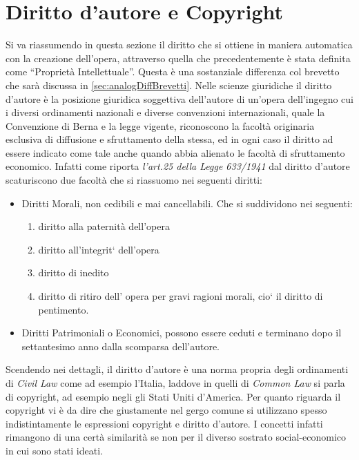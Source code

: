\section{Diritto d'autore e Copyright}
Si va riassumendo in questa sezione il diritto che si ottiene in maniera automatica con la creazione dell'opera, attraverso quella che precedentemente è stata definita come ``Proprietà Intellettuale''. Questa è una sostanziale differenza col brevetto che sarà discussa in \ref{sec:analogDiffBrevetti}.
Nelle scienze giuridiche il diritto d'autore è la posizione giuridica soggettiva dell'autore di un'opera dell'ingegno cui i diversi ordinamenti nazionali e diverse convenzioni internazionali, quale la Convenzione di Berna e la legge vigente, riconoscono la facoltà originaria esclusiva di diffusione e sfruttamento della stessa, ed in ogni caso il diritto ad essere indicato come tale anche quando abbia alienato le facoltà di sfruttamento economico.
Infatti come riporta \textit{l'art.25 della Legge 633/1941} dal diritto d'autore scaturiscono due facoltà che si riassuomo nei seguenti diritti:
\begin{itemize}
 \item Diritti Morali, non cedibili e mai cancellabili. Che si suddividono nei seguenti:

\begin{enumerate}
\item diritto alla paternità dell’opera
\item diritto all’integrit` dell’opera
\item diritto di inedito
\item diritto di ritiro dell’ opera per gravi ragioni morali, cio` il diritto di pentimento.
\end{enumerate}

 \item Diritti Patrimoniali o Economici, possono essere ceduti e terminano dopo il settantesimo anno dalla scomparsa dell'autore.
\end{itemize}


Scendendo nei dettagli, il diritto d'autore è una norma propria degli ordinamenti di \textit{Civil Law} come ad esempio l'Italia, laddove in quelli di \textit{Common Law} si parla di copyright, ad esempio negli gli Stati Uniti d'America.
Per quanto riguarda il copyright vi è da dire che giustamente nel gergo comune si utilizzano spesso indistintamente le espressioni copyright e diritto d’autore. I concetti infatti rimangono di una certà similarità se non per il diverso  sostrato social-economico in cui sono stati ideati.

